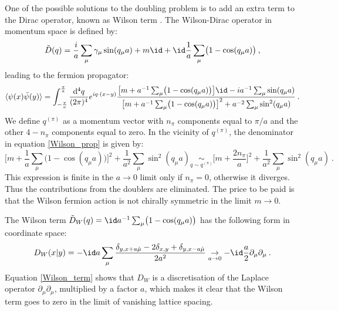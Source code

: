 One of the possible solutions to the doubling problem is to add an extra term to the Dirac operator, known as Wilson term \cite{Wilson:1975id}. The Wilson-Dirac operator in momentum space is defined by:
\begin{equation}
\tilde D(q) = \frac{i}{a} \sum_{\mu} \gamma_{\mu} \sin (q_{\mu} a) + m \id + \id \frac{1}{a} \sum_{\mu} \bigl( 1 - \cos(q_{\mu}a) \bigr) \: , 
\end{equation}
%
leading to the fermion propagator:
\begin{equation}
\langle \psi(x) \bar \psi(y) \rangle = \int_{-\frac{\pi}{a}}^{\frac{\pi}{a}} \frac{\mathrm{d}^4 q}{(2 \pi)^4} e^{iq\cdot (x-y)}  \frac{\bigl[ m + a^{-1} \sum_{\mu}\bigl( 1 - \cos(q_{\mu}a) \bigr)\bigr] \id                                                                           - i a^{-1} \sum_{\mu} \sin(q_{\mu}a)}{\bigl[m + a^{-1}\sum_{\mu} \bigl(1 - \cos(q_{\mu}a) \bigr) \bigr]^2  + a^{-2}\sum_{\mu} \sin^2(q_{\mu}a) } \: .
\label{Wilson_prop}
\end{equation}
%
We define $q^{(\pi)}$ as a momentum vector with $n_{\pi}$ components equal to $\pi/a$ and the other $4-n_{\pi}$ components equal to zero.
In the vicinity of $q^{(\pi)}$, the denominator in equation \ref{Wilson_prop} is given by:
\begin{equation}
\biggl[m + \frac{1}{a}\sum_{\mu} \bigl(1 - \cos(q_{\mu}a) \bigr) \biggr]^2  + \frac{1}{a^2}\sum_{\mu} \sin^2(q_{\mu}a) \underset{q \sim q^{(\pi)}}{\sim}
\biggl[m + \frac{2 n_{\pi}}{a} \biggr]^2  +\frac{1}{a^2}\sum_{\mu} \sin^2(q_{\mu}a) \: .
\end{equation}
%
This expression is finite in the $a \to 0$ limit only if $n_{\pi} = 0$, otherwise it diverges. Thus the contributions from the doublers are eliminated. The price to be paid is that the Wilson fermion action is not chirally symmetric in the limit $m \to 0$. 



The Wilson term $\tilde D_W (q) = \id a^{-1} \sum_{\mu}\bigl( 1 - \cos(q_{\mu}a) \bigr)$ has the following  form in coordinate space:
\begin{equation}
D_W(x \vert y) = -\id  a \sum_{\mu} \frac{\delta_{y,x+a\hat\mu} -2 \delta_{x,y} + \delta_{y,x-a\hat\mu}}{2a^2} \underset{a \to 0} \to - \id\frac{a}{2} \partial_{\mu}\partial_{\mu} \: .
\label{Wilson_term}
\end{equation}
%
Equation \ref{Wilson_term} shows that $D_W$ is a discretisation of the Laplace operator $\partial_{\mu}\partial_{\mu}$, multiplied by a factor $a$, which makes it clear that the Wilson term goes to zero in the limit of vanishing lattice spacing.


